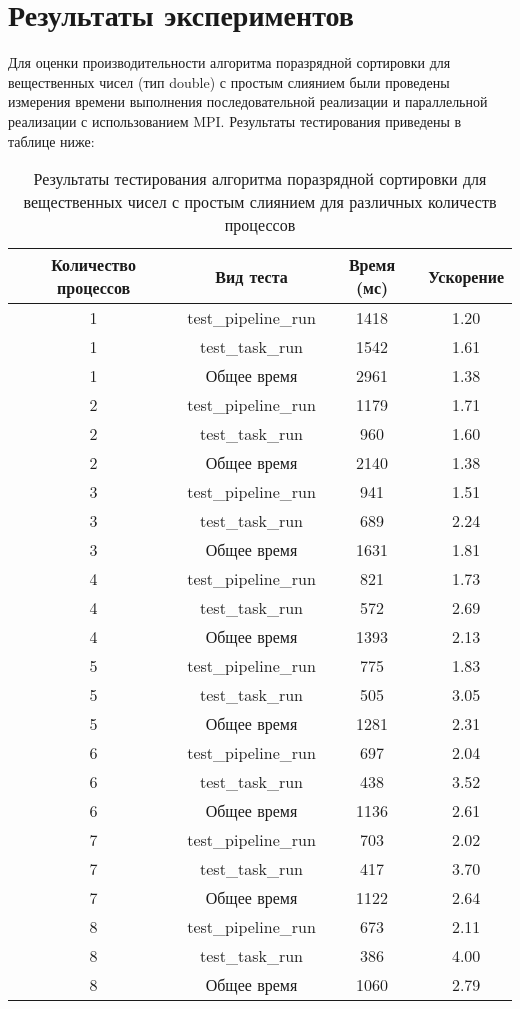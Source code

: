 \documentclass[12pt]{article}
\begin{document}
\section{Результаты экспериментов}

Для оценки производительности алгоритма поразрядной сортировки для вещественных чисел (тип double) с простым слиянием были проведены измерения времени выполнения последовательной реализации и параллельной реализации с использованием MPI. Результаты тестирования приведены в таблице ниже:
\begin{table}[H]
\centering
\caption{Результаты тестирования алгоритма поразрядной сортировки для вещественных чисел с простым слиянием для различных количеств процессов}
\begin{tabular}{|c|c|c|c|}
\hline
\textbf{Количество процессов} & \textbf{Вид теста} & \textbf{Время (мс)} & \textbf{Ускорение} \\
\hline
1 & test\_pipeline\_run & 1418 & 1.20 \\
\hline
1 & test\_task\_run & 1542 & 1.61 \\
\hline
1 & Общее время & 2961 & 1.38 \\
\hline
2 & test\_pipeline\_run & 1179 & 1.71 \\
\hline
2 & test\_task\_run & 960  & 1.60 \\
\hline
2 & Общее время & 2140 & 1.38 \\
\hline
3 & test\_pipeline\_run & 941  & 1.51 \\
\hline
3 & test\_task\_run & 689  & 2.24 \\
\hline
3 & Общее время & 1631 & 1.81 \\
\hline
4 & test\_pipeline\_run & 821  & 1.73 \\
\hline
4 & test\_task\_run & 572  & 2.69 \\
\hline
4 & Общее время & 1393 & 2.13 \\
\hline
5 & test\_pipeline\_run & 775  & 1.83 \\
\hline
5 & test\_task\_run & 505  & 3.05 \\
\hline
5 & Общее время & 1281 & 2.31 \\
\hline
6 & test\_pipeline\_run & 697  & 2.04 \\
\hline
6 & test\_task\_run & 438  & 3.52 \\
\hline
6 & Общее время & 1136 & 2.61 \\
\hline
7 & test\_pipeline\_run & 703  & 2.02 \\
\hline
7 & test\_task\_run & 417  & 3.70 \\
\hline
7 & Общее время & 1122 & 2.64 \\
\hline
8 & test\_pipeline\_run & 673  & 2.11 \\
\hline
8 & test\_task\_run & 386  & 4.00 \\
\hline
8 & Общее время & 1060 & 2.79 \\
\hline
\end{tabular}
\label{tab:performance_results}
\end{table}
\end{document}
